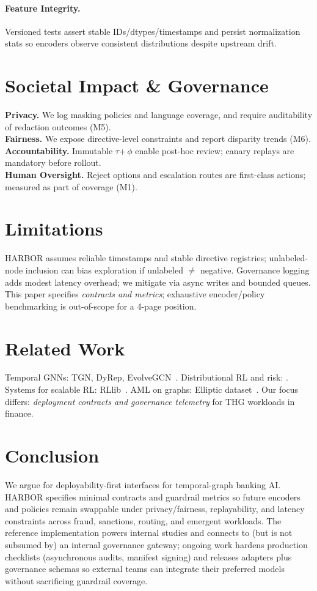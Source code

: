 \documentclass[letterpaper]{article}
\begin{document}
\paragraph{Feature Integrity.}
Versioned tests assert stable IDs/dtypes/timestamps and persist normalization stats so encoders observe consistent distributions despite upstream drift.

\section{Societal Impact \& Governance}
\label{sec:societal}
\textbf{Privacy.} We log masking policies and language coverage, and require auditability of redaction outcomes (M5).\\
\textbf{Fairness.} We expose directive-level constraints and report disparity trends (M6).\\
\textbf{Accountability.} Immutable $\tau$+\,$\phi$ enable post-hoc review; canary replays are mandatory before rollout.\\
\textbf{Human Oversight.} Reject options and escalation routes are first-class actions; measured as part of coverage (M1).

\section{Limitations}
\label{sec:limits}
\textsc{HARBOR} assumes reliable timestamps and stable directive registries; unlabeled-node inclusion can bias exploration if unlabeled $\neq$ negative. Governance logging adds modest latency overhead; we mitigate via async writes and bounded queues. This paper specifies \emph{contracts and metrics}; exhaustive encoder/policy benchmarking is out-of-scope for a 4-page position.

\section{Related Work}
\label{sec:rw}
Temporal GNNs: TGN, DyRep, EvolveGCN~\citep{rossi2020tgn,trivedi2019dyrep,pareja2020evolvegcn}. Distributional RL and risk: \citet{dabney2018distributional,chow2015risk}. Systems for scalable RL: RLlib~\citep{liang2018rllib}. AML on graphs: Elliptic dataset~\citep{weber2019aml}. Our focus differs: \emph{deployment contracts and governance telemetry} for THG workloads in finance.

\section{Conclusion}
\label{sec:conclusion}
We argue for deployability-first interfaces for temporal-graph banking AI. \textsc{HARBOR} specifies minimal contracts and guardrail metrics so future encoders and policies remain swappable under privacy/fairness, replayability, and latency constraints across fraud, sanctions, routing, and emergent workloads. The reference implementation powers internal studies and connects to (but is not subsumed by) an internal governance gateway; ongoing work hardens production checklists (asynchronous audits, manifest signing) and releases adapters plus governance schemas so external teams can integrate their preferred models without sacrificing guardrail coverage.



\end{document}
